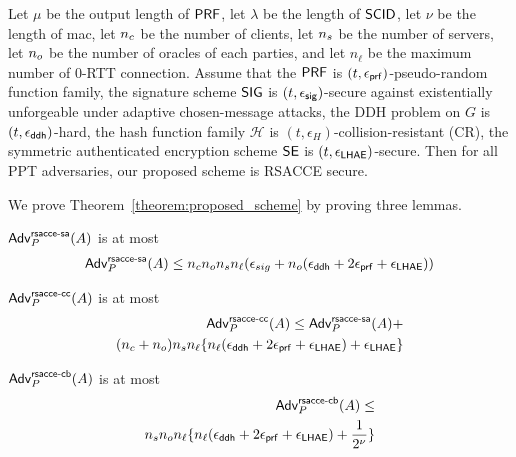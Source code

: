 \begin{theorem} \label{theorem:proposed_scheme}
 Let $\mu$ be the output length of $\mathsf{PRF}$, let $\lambda$ be
 the length of $\mathsf{SCID}$, let $\nu$ be the length of mac, let $n_c$ be the number of
 clients, let $n_s$ be the number of servers, let
 $n_o$ be the number of oracles of each parties, and
 let $n_{\ell}$ be the maximum number of 0-RTT connection. Assume
 that the $\mathsf{PRF}$ is $(t, \epsilon_{\mathsf{prf}})$-pseudo-random
 function family, the signature scheme
 $\mathsf{SIG}$ is $(t, \epsilon_{\mathsf{sig}})$-secure against existentially
 unforgeable under adaptive chosen-message attacks, the DDH
 problem on $G$ is $(t, \epsilon_{\mathsf{ddh}})$-hard, the hash
 function family $\mathcal{H}$ is
 $(t,\epsilon_{H})$-collision-resistant (CR), the symmetric
 authenticated encryption scheme $\mathsf{SE}$ is
 $(t, \epsilon_{\mathsf{LHAE}})$-secure.
 Then for all PPT adversaries, our proposed scheme is RSACCE secure.
\end{theorem}

We prove Theorem~\ref{theorem:proposed_scheme} by proving three lemmas.

\begin{lemma} \label{lemma:proposed_scheme_rsacce-sa}
 $\mathsf{Adv}^{\mathsf{rsacce\textsc{-} sa}}_{P}(A)$ is at most
 \begin{eqnarray}
  \mathsf{Adv}^{\mathsf{rsacce\textsc{-} sa}}_{P}(A) \leq n_c n_o n_s n_{\ell}
  (\epsilon_{sig} + n_o (\epsilon_{\mathsf{ddh}} + 2\epsilon_{\mathsf{prf}} + \epsilon_{\mathsf{LHAE}}))
 \end{eqnarray}
\end{lemma}
%


\begin{lemma} \label{lemma:proposed_scheme_rsacce-cc}
 $\mathsf{Adv}^{\mathsf{rsacce\textsc{-} cc}}_{P}(A)$ is at most
 \begin{eqnarray}
  \mathsf{Adv}^{\mathsf{rsacce\textsc{-} cc}}_{P}(A) \leq \mathsf{Adv}^{\mathsf{rsacce\textsc{-} sa}}_{P}(A) + \nonumber \\
  (n_c + n_o) n_s n_{\ell} \{ n_{\ell}(\epsilon_{\mathsf{ddh}} + 2\epsilon_{\mathsf{prf}} + \epsilon_{\mathsf{LHAE}})
  + \epsilon_{\mathsf{LHAE}} \}
 \end{eqnarray}
\end{lemma}
%


\begin{lemma} \label{lemma:proposed_scheme_rsacce-cb}
 $\mathsf{Adv}^{\mathsf{rsacce\textsc{-} cb}}_{P}(A)$ is at most
 \begin{eqnarray}
  \mathsf{Adv}^{\mathsf{rsacce\textsc{-} cb}}_{P}(A) \leq \nonumber \\
  n_s n_o n_{\ell} \{ n_{\ell}(\epsilon_{\mathsf{ddh}} + 2\epsilon_{\mathsf{prf}} + \epsilon_{\mathsf{LHAE}}) + \frac{1}{2^{\nu}} \}
 \end{eqnarray}
\end{lemma}
%


